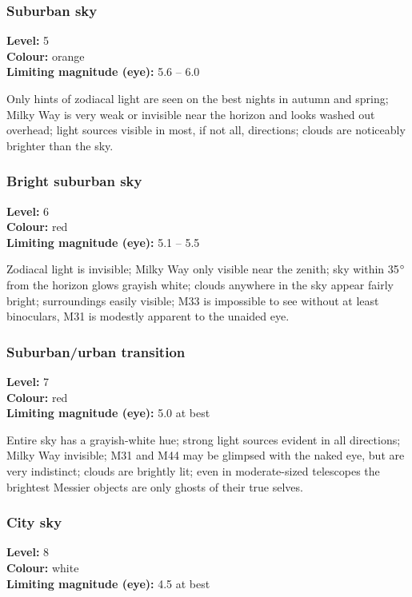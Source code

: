 \subsubsection{Suburban sky}
\textbf{Level:} 5 \\
\textbf{Colour:} orange \\
\textbf{Limiting magnitude (eye):} 5.6 -- 6.0

Only hints of zodiacal light are seen on the best nights in autumn and spring; Milky Way is very weak or invisible near the horizon and looks washed out overhead; light sources visible in most, if not all, directions; clouds are noticeably brighter than the sky.

\subsubsection{Bright suburban sky}
\textbf{Level:} 6 \\
\textbf{Colour:} red \\
\textbf{Limiting magnitude (eye):} 5.1 -- 5.5

Zodiacal light is invisible; Milky Way only visible near the zenith; sky within 35$\degree$ from the horizon glows grayish white; clouds anywhere in the sky appear fairly bright; surroundings easily visible; M33 is impossible to see
without at least binoculars, M31 is modestly apparent to the unaided eye.

\subsubsection{Suburban/urban transition}
\textbf{Level:} 7 \\
\textbf{Colour:} red \\
\textbf{Limiting magnitude (eye):} 5.0 at best

Entire sky has a grayish-white hue; strong light sources evident in all directions; Milky Way invisible; M31 and M44 may be glimpsed with the naked eye, but are very indistinct; clouds are brightly lit; even in moderate-sized telescopes the brightest Messier objects are only ghosts of their true selves.

\subsubsection{City sky}
\textbf{Level:} 8 \\
\textbf{Colour:} white \\
\textbf{Limiting magnitude (eye):} 4.5 at best

